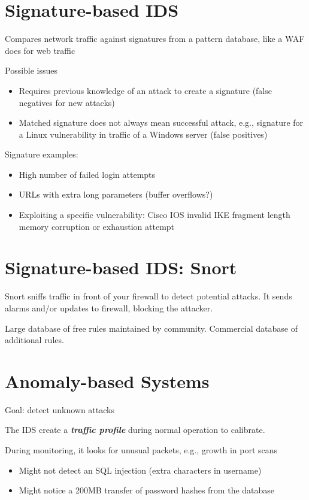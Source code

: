 \documentclass[11pt]{article}
\begin{document}
\section*{Signature-based IDS}

Compares network traffic against signatures from a pattern database, like a WAF does for web traffic

Possible issues
\begin{itemize}
	\item Requires previous knowledge of an attack to create a signature (false negatives for new attacks)
	\item Matched signature does not always mean successful attack, e.g., signature for a Linux vulnerability in traffic of a Windows server (false positives)
\end{itemize}

Signature examples:
\begin{itemize}
	\item High number of failed login attempts
	\item URLs with extra long parameters (buffer overflows?)
	\item Exploiting a specific vulnerability: Cisco IOS invalid IKE fragment length memory corruption or exhaustion attempt
\end{itemize}

\section*{Signature-based IDS: Snort}

Snort sniffs traffic in front of your firewall to detect potential attacks. It sends alarms and/or updates to firewall, blocking the attacker. 

Large database of free rules maintained by community. Commercial database of additional rules. 

\section*{Anomaly-based Systems}

Goal: detect unknown attacks

The IDS create a \textbf{\textit{traffic profile}} during normal operation to calibrate. 

During monitoring, it looks for unusual packets, e.g., growth in port scans

\begin{itemize}
	\item Might not detect an SQL injection (extra characters in username)
	\item Might notice a 200MB transfer of password hashes from the database
\end{itemize}
\end{document}
